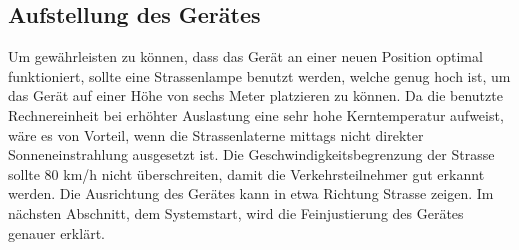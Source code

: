 \subsection{Aufstellung des Gerätes}
Um gewährleisten zu können, dass das Gerät an einer neuen Position optimal funktioniert, sollte eine Strassenlampe benutzt werden, welche genug hoch ist, um das Gerät auf einer Höhe von sechs Meter platzieren zu können. Da die benutzte Rechnereinheit bei erhöhter Auslastung eine sehr hohe Kerntemperatur aufweist, wäre es von Vorteil, wenn die Strassenlaterne mittags nicht direkter Sonneneinstrahlung ausgesetzt ist. Die Geschwindigkeitsbegrenzung der Strasse sollte 80 km/h nicht überschreiten, damit die Verkehrsteilnehmer gut erkannt werden. Die Ausrichtung des Gerätes kann in etwa Richtung Strasse zeigen. Im nächsten Abschnitt, dem Systemstart, wird die Feinjustierung des Gerätes genauer erklärt.